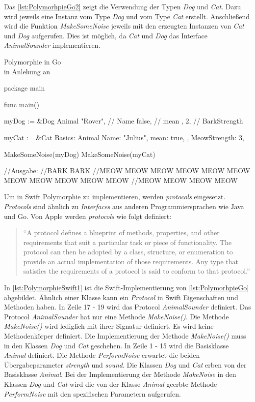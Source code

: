 Das \autoref{lst:PolymorhpieGo2} zeigt die Verwendung der Typen \emph{Dog} und \emph{Cat}.
Dazu wird jeweils eine Instanz vom Type \emph{Dog} und vom Type \emph{Cat} erstellt. 
Anschließend wird die Funktion \emph{MakeSomeNoise} jeweils mit den erzeugten Instanzen von \emph{Cat} und \emph{Dog} aufgerufen. 
Dies ist möglich, da \emph{Cat} und \emph{Dog} das Interface \emph{AnimalSounder} implementieren. 

\begin{listing}[H]
\caption{Polymorphie in Go \\ in Anlehung an \cite[]{WilliamKennedy.2013}}
\label{lst:PolymorhpieGo2}
\begin{GoCode}
package main

func main() {
    myDog := &Dog{
        Animal{
            "Rover", // Name
            false,   // mean
        },
        2, // BarkStrength
    }

    myCat := &Cat{
        Basics: Animal{
            Name: "Julius",
            mean: true,
        },
        MeowStrength: 3,
    }

    MakeSomeNoise(myDog)
    MakeSomeNoise(myCat)
}
//Ausgabe:
//BARK BARK
//MEOW MEOW MEOW MEOW MEOW MEOW MEOW MEOW MEOW MEOW MEOW 
//MEOW MEOW MEOW MEOW
\end{GoCode}
\end{listing}

Um in Swift Polymorphie zu implementieren, werden \textit{protocols} eingesetzt.
\textit{Protocols} sind ähnlich zu \textit{Interfaces} aus anderen Programmiersprachen wie Java und Go.
Von Apple werden \textit{protocols} wie folgt definiert:

\begin{quote}
\enquote{A protocol defines a blueprint of methods, properties, and other requirements that suit a particular
task or piece of functionality. The protocol can then be adopted by a class, structure, or enumeration
to provide an actual implementation of those requirements. Any type that satisfies the requirements of
a protocol is said to conform to that protocol.} \cite[S.341]{Apple.2017}
\end{quote}

In \autoref{lst:PolymorphieSwift1} ist die Swift-Implementierung von \autoref{lst:PolymorhpieGo} abgebildet.
Ähnlich einer Klasse kann ein \textit{Protocol} in Swift Eigenschaften und Methoden haben. 
In Zeile 17 - 19 wird das Protocol \textit{AnimalSounder} definiert. 
Das Protocol \textit{AnimalSounder} hat nur eine Methode \textit{MakeNoise()}. 
Die Methode \textit{MakeNoise()} wird lediglich mit ihrer Signatur definiert. 
Es wird keine Methodenkörper definiert. 
Die Implementierung der Methode \textit{MakeNoise()} muss in den Klassen \textit{Dog} und \textit{Cat} geschehen.
In Zeile 1 - 15 wird die Basisklasse \textit{Animal} definiert. 
Die Methode \textit{PerformNoise} erwartet die beiden Übergabeparameter \textit{strength} und \textit{sound}.
Die Klassen \textit{Dog} und \textit{Cat} erben von der Basisklasse \textit{Animal}.
Bei der Implementierung der Methode \textit{MakeNoise} in den Klassen \textit{Dog} und \textit{Cat} wird die von der Klasse \textit{Animal} geerbte Methode \textit{PerformNoise} mit den spezifischen Parametern aufgerufen.

